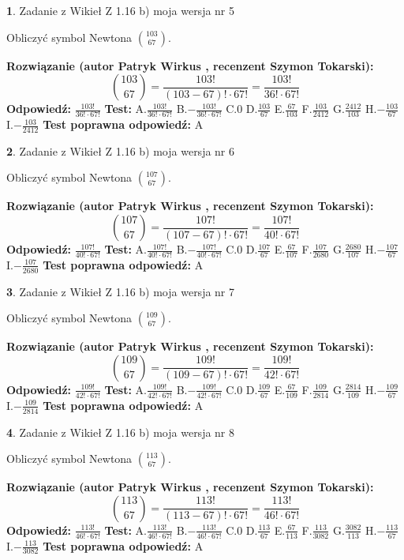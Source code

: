 \documentclass[12pt, a4paper]{article}
\theoremstyle{definition} %
\newtheorem{zad}{}
\newcommand{\zadStart}[1]{\begin{zad}#1\newline}
\newcommand{\zadStop}{\end{zad}}
\newcommand{\rozwStart}[2]{\noindent \textbf{Rozwiązanie (autor #1 , recenzent #2): }\newline}
\newcommand{\rozwStop}{\newline}
\newcommand{\odpStart}{\noindent \textbf{Odpowiedź:}\newline}
\newcommand{\odpStop}{\newline}
\newcommand{\testStart}{\noindent \textbf{Test:}\newline}
\newcommand{\testStop}{\newline}
\newcommand{\kluczStart}{\noindent \textbf{Test poprawna odpowiedź:}\newline}
\newcommand{\kluczStop}{\newline}
\begin{document}
\zadStart{Zadanie z Wikieł Z 1.16 b) moja wersja nr 5}

Obliczyć symbol Newtona ${103 \choose 67}$.
\zadStop
\rozwStart{Patryk Wirkus}{Szymon Tokarski}
$${103 \choose 67} = \frac{103!}{(103-67)! \cdot 67!} = \frac{103!}{36! \cdot 67!}$$
\rozwStop
\odpStart
$\frac{103!}{36! \cdot 67!}$
\odpStop
\testStart
A.$\frac{103!}{36! \cdot 67!}$ B.$-\frac{103!}{36! \cdot 67!}$ C.$0$ D.$\frac{103}{67}$ E.$\frac{67}{103}$
F.$\frac{103}{2412}$ G.$\frac{2412}{103}$
H.$-\frac{103}{67}$
I.$-\frac{103}{2412}$
\testStop
\kluczStart
A
\kluczStop



\zadStart{Zadanie z Wikieł Z 1.16 b) moja wersja nr 6}

Obliczyć symbol Newtona ${107 \choose 67}$.
\zadStop
\rozwStart{Patryk Wirkus}{Szymon Tokarski}
$${107 \choose 67} = \frac{107!}{(107-67)! \cdot 67!} = \frac{107!}{40! \cdot 67!}$$
\rozwStop
\odpStart
$\frac{107!}{40! \cdot 67!}$
\odpStop
\testStart
A.$\frac{107!}{40! \cdot 67!}$ B.$-\frac{107!}{40! \cdot 67!}$ C.$0$ D.$\frac{107}{67}$ E.$\frac{67}{107}$
F.$\frac{107}{2680}$ G.$\frac{2680}{107}$
H.$-\frac{107}{67}$
I.$-\frac{107}{2680}$
\testStop
\kluczStart
A
\kluczStop



\zadStart{Zadanie z Wikieł Z 1.16 b) moja wersja nr 7}

Obliczyć symbol Newtona ${109 \choose 67}$.
\zadStop
\rozwStart{Patryk Wirkus}{Szymon Tokarski}
$${109 \choose 67} = \frac{109!}{(109-67)! \cdot 67!} = \frac{109!}{42! \cdot 67!}$$
\rozwStop
\odpStart
$\frac{109!}{42! \cdot 67!}$
\odpStop
\testStart
A.$\frac{109!}{42! \cdot 67!}$ B.$-\frac{109!}{42! \cdot 67!}$ C.$0$ D.$\frac{109}{67}$ E.$\frac{67}{109}$
F.$\frac{109}{2814}$ G.$\frac{2814}{109}$
H.$-\frac{109}{67}$
I.$-\frac{109}{2814}$
\testStop
\kluczStart
A
\kluczStop



\zadStart{Zadanie z Wikieł Z 1.16 b) moja wersja nr 8}

Obliczyć symbol Newtona ${113 \choose 67}$.
\zadStop
\rozwStart{Patryk Wirkus}{Szymon Tokarski}
$${113 \choose 67} = \frac{113!}{(113-67)! \cdot 67!} = \frac{113!}{46! \cdot 67!}$$
\rozwStop
\odpStart
$\frac{113!}{46! \cdot 67!}$
\odpStop
\testStart
A.$\frac{113!}{46! \cdot 67!}$ B.$-\frac{113!}{46! \cdot 67!}$ C.$0$ D.$\frac{113}{67}$ E.$\frac{67}{113}$
F.$\frac{113}{3082}$ G.$\frac{3082}{113}$
H.$-\frac{113}{67}$
I.$-\frac{113}{3082}$
\testStop
\kluczStart
A
\kluczStop
\end{document}
